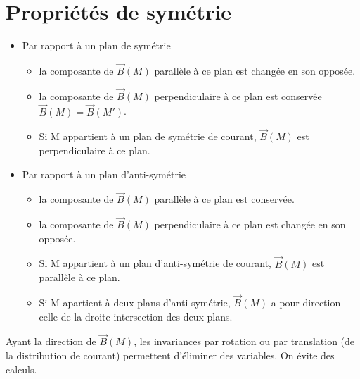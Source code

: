\documentclass[11pt,a4paper,french]{article}
\begin{document}
\section{Propriétés de symétrie}
\begin{itemize}
\item Par rapport à un plan de symétrie
\begin{itemize}
\item la composante de $\vec B(M)$ parallèle à ce plan est changée en son opposée.
\item la composante de $\vec B(M)$ perpendiculaire à ce plan est conservée $\vec B(M) = \vec B(M')$.
\item Si M appartient à un plan de symétrie de courant, $\vec B(M)$ est perpendiculaire à ce plan.
\end{itemize}
\item Par rapport à un plan d'anti-symétrie
\begin{itemize}
\item la composante de $\vec B(M)$ parallèle à ce plan est conservée.
\item la composante de $\vec B(M)$ perpendiculaire à ce plan est changée en son opposée.
\item Si M appartient à un plan d'anti-symétrie de courant, $\vec B(M)$ est parallèle à ce plan.
\item Si M apartient à deux plans d'anti-symétrie, $\vec B(M)$ a pour direction celle de la droite intersection des deux plans.
\end{itemize}
\end{itemize}
Ayant la direction de $\vec B(M)$, les invariances par rotation ou par translation (de la distribution de courant) permettent d'éliminer des variables. On évite des calculs.
\newpage
\end{document}
